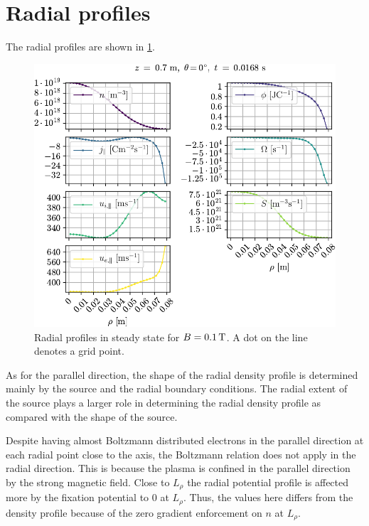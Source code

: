 \section{Radial profiles}
%
The radial profiles are shown in \cref{fig:radProfs}.
%
\begin{figure}[htb]
    \centering
    \includegraphics{fig/results/1DProfiles/B010Rad}
    \caption{Radial profiles in steady state for $B=0.1\, \text{T}$.
        A dot on the line denotes a grid point.
    }
    \label{fig:radProfs}
\end{figure}
%
As for the parallel direction, the shape of the radial density profile is determined mainly by the source and the radial boundary conditions.
The radial extent of the source plays a larger role in determining the radial density profile as compared with the shape of the source.

Despite having almost Boltzmann distributed electrons in the parallel direction at each radial point close to the axis, the Boltzmann relation does not apply in the radial direction.
This is because the plasma is confined in the parallel direction by the strong magnetic field.
Close to $L_\rho$ the radial potential profile is affected more by the fixation potential to $0$ at $L_\rho$.
Thus, the values here differs from the density profile because of the zero gradient enforcement on $n$ at $L_\rho$.
